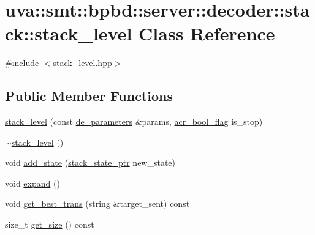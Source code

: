 \hypertarget{classuva_1_1smt_1_1bpbd_1_1server_1_1decoder_1_1stack_1_1stack__level}{}\section{uva\+:\+:smt\+:\+:bpbd\+:\+:server\+:\+:decoder\+:\+:stack\+:\+:stack\+\_\+level Class Reference}
\label{classuva_1_1smt_1_1bpbd_1_1server_1_1decoder_1_1stack_1_1stack__level}


{\ttfamily \#include $<$stack\+\_\+level.\+hpp$>$}

\subsection*{Public Member Functions}
\begin{DoxyCompactItemize}
\item 
\hyperlink{classuva_1_1smt_1_1bpbd_1_1server_1_1decoder_1_1stack_1_1stack__level_a0b4a0804fe2e2ff95adcea7524bde943}{stack\+\_\+level} (const \hyperlink{namespaceuva_1_1smt_1_1bpbd_1_1server_1_1decoder_aaf4d5faf3a48156401c854d163d4b848}{de\+\_\+parameters} \&params, \hyperlink{namespaceuva_1_1utils_1_1threads_a1c174d3a90b2b056554d897188ad2c74}{acr\+\_\+bool\+\_\+flag} is\+\_\+stop)
\item 
\hyperlink{classuva_1_1smt_1_1bpbd_1_1server_1_1decoder_1_1stack_1_1stack__level_a0c3e904bae304d82a82512b930512119}{$\sim$stack\+\_\+level} ()
\item 
void \hyperlink{classuva_1_1smt_1_1bpbd_1_1server_1_1decoder_1_1stack_1_1stack__level_a7bf7e806780c481ad3e1107c240b76da}{add\+\_\+state} (\hyperlink{namespaceuva_1_1smt_1_1bpbd_1_1server_1_1decoder_1_1stack_ab08047a5fae45b1c4311bd5d5aa2c4fc}{stack\+\_\+state\+\_\+ptr} new\+\_\+state)
\item 
void \hyperlink{classuva_1_1smt_1_1bpbd_1_1server_1_1decoder_1_1stack_1_1stack__level_a69347391556956dd6307a7e964d2847c}{expand} ()
\item 
void \hyperlink{classuva_1_1smt_1_1bpbd_1_1server_1_1decoder_1_1stack_1_1stack__level_af9b62b70fda5f4d743e86a6a65a95071}{get\+\_\+best\+\_\+trans} (string \&target\+\_\+sent) const 
\item 
size\+\_\+t \hyperlink{classuva_1_1smt_1_1bpbd_1_1server_1_1decoder_1_1stack_1_1stack__level_aef60eb980e7e283c59a5b0a1db12c42b}{get\+\_\+size} () const 
\end{DoxyCompactItemize}
